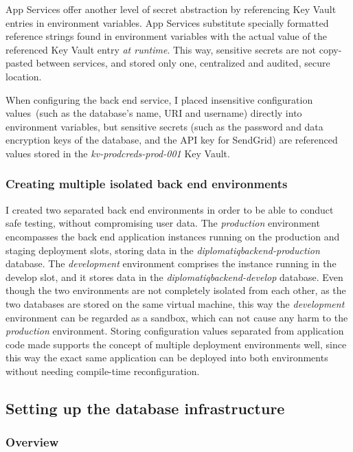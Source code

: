 App Services offer another level of secret abstraction by referencing Key Vault entries in environment variables. App Services substitute specially formatted reference strings found in environment variables with the actual value of the referenced Key Vault entry \emph{at runtime}. This way, sensitive secrets are not copy-pasted between services, and stored only one, centralized and audited, secure location.

When configuring the back end service, I placed insensitive configuration values (such as the database's name, URI and username) directly into environment variables, but sensitive secrets (such as the password and data encryption keys of the database, and the API key for SendGrid) are referenced values stored in the \emph{kv-prodcreds-prod-001} Key Vault.

\subsubsection{Creating multiple isolated back end environments}

I created two separated back end environments in order to be able to conduct safe testing, without compromising user data. The \emph{production} environment encompasses the back end application instances running on the production and staging deployment slots, storing data in the \emph{diplomatiqbackend-production} database. The \emph{development} environment comprises the instance running in the develop slot, and it stores data in the \emph{diplomatiqbackend-develop} database. Even though the two environments are not completely isolated from each other, as the two databases are stored on the same virtual machine, this way the \emph{development} environment can be regarded as a sandbox, which can not cause any harm to the \emph{production} environment. Storing configuration values separated from application code made supports the concept of multiple deployment environments well, since this way the exact same application can be deployed into both environments without needing compile-time reconfiguration.

\subsection{Setting up the database infrastructure}
\label{section:database}

\subsubsection{Overview}

